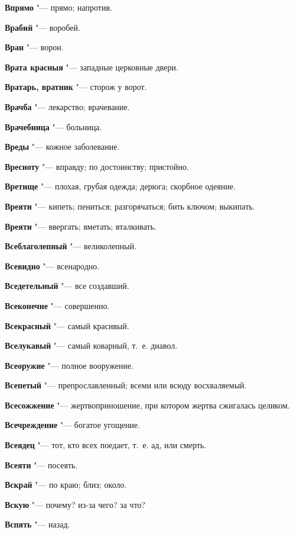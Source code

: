 \begin{mymulticols}
\noindent\textbf{Впрямо} "--- прямо; напротив. 

\noindent\textbf{Врабий} "--- воробей. 

\noindent\textbf{Вран} "--- ворон. 

\noindent\textbf{Врата красныя} "--- западные церковные двери. 

\noindent\textbf{Вратарь, вратник} "--- сторож у ворот. 

\noindent\textbf{Врачба} "--- лекарство; врачевание. 

\noindent\textbf{Врачебница} "--- больница. 

\noindent\textbf{Вреды} "--- кожное заболевание. 

\noindent\textbf{Вресноту} "--- вправду; по достоинству; пристойно. 

\noindent\textbf{Вретище} "--- плохая, грубая одежда; дерюга; скорбное одеяние. 

\noindent\textbf{Вреяти} "--- кипеть; пениться; разгорячаться; бить ключом; выкипать. 

\noindent\textbf{Вреяти} "--- ввергать; вметать; вталкивать. 

\noindent\textbf{Всеблаголепный} "--- великолепный. 

\noindent\textbf{Всевидно} "--- всенародно. 

\noindent\textbf{Вседетельный} "--- все создавший. 

\noindent\textbf{Всеконечне} "--- совершенно. 

\noindent\textbf{Всекрасный} "--- самый красивый. 

\noindent\textbf{Вселукавый} "--- самый коварный, т.~е. диавол. 

\noindent\textbf{Всеоружие} "--- полное вооружение. 

\noindent\textbf{Всепетый} "--- препрославленный; всеми или всюду восхваляемый. 

\noindent\textbf{Всесожжение} "--- жертвоприношение, при котором жертва сжигалась целиком. 

\noindent\textbf{Всечреждение} "--- богатое угощение. 

\noindent\textbf{Всеядец} "--- тот, кто всех поедает, т.~е. ад, или смерть. 

\noindent\textbf{Всеяти} "--- посеять. 

\noindent\textbf{Вскрай} "--- по краю; близ; около. 

\noindent\textbf{Вскую} "--- почему? из-за чего? за что? 

\noindent\textbf{Вспять} "--- назад. 


\end{mymulticols}
